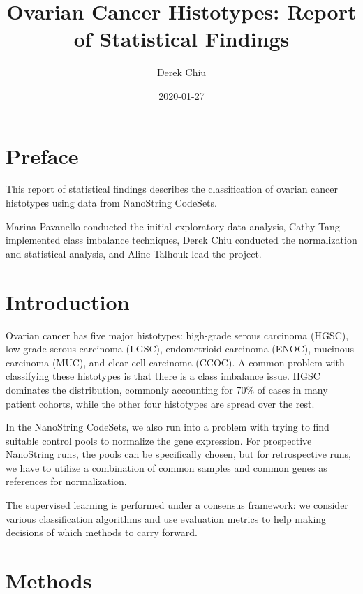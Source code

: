 \documentclass[
]{report}
\title{Ovarian Cancer Histotypes: Report of Statistical Findings}
\author{Derek Chiu}
\date{2020-01-27}
\begin{document}
\maketitle

{
\hypersetup{linkcolor=}
\setcounter{tocdepth}{1}
\tableofcontents
}
\listoftables
\listoffigures
\hypertarget{preface}{%
\chapter*{Preface}\label{preface}}

This report of statistical findings describes the classification of ovarian cancer histotypes using data from NanoString CodeSets.

Marina Pavanello conducted the initial exploratory data analysis, Cathy Tang implemented class imbalance techniques, Derek Chiu conducted the normalization and statistical analysis, and Aline Talhouk lead the project.

\hypertarget{introduction}{%
\chapter{Introduction}\label{introduction}}

Ovarian cancer has five major histotypes: high-grade serous carcinoma (HGSC), low-grade serous carcinoma (LGSC), endometrioid carcinoma (ENOC), mucinous carcinoma (MUC), and clear cell carcinoma (CCOC). A common problem with classifying these histotypes is that there is a class imbalance issue. HGSC dominates the distribution, commonly accounting for 70\% of cases in many patient cohorts, while the other four histotypes are spread over the rest.

In the NanoString CodeSets, we also run into a problem with trying to find suitable control pools to normalize the gene expression. For prospective NanoString runs, the pools can be specifically chosen, but for retrospective runs, we have to utilize a combination of common samples and common genes as references for normalization.

The supervised learning is performed under a consensus framework: we consider various classification algorithms and use evaluation metrics to help making decisions of which methods to carry forward.

\hypertarget{methods}{%
\chapter{Methods}\label{methods}}
\end{document}
